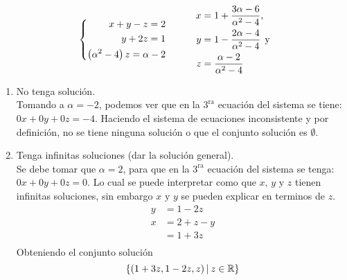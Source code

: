\documentclass{article}
\begin{document}
\begin{enumerate}
        \[
            \left\{
                \begin{aligned}
                    x + y - z = 2 \\
                    y + 2z = 1 \\
                    \left(\alpha^2 - 4\right)z = \alpha - 2
                \end{aligned}
            \right.
            \hspace{1cm}
            \begin{aligned}
                x &= 1 + \frac{3\alpha - 6}{\alpha^2 - 4} \text{,} \\
                y &= 1 - \frac{2\alpha - 4}{\alpha^2 - 4} \hspace{1ex} \text{y}  \\
                z &= \frac{\alpha - 2}{\alpha^2 - 4}
            \end{aligned}
        \]
        \begin{enumerate}[label=\listAlph]
            \item No tenga solución. \\
                Tomando a \(\alpha = -2\), podemos ver que en la \(3^{\text{ra}}\) ecuación del sistema se tiene: \(0x + 0y + 0z = -4\). 
                Haciendo el sistema de ecuaciones inconsistente y por definición, no se tiene ninguna solución o que el conjunto solución es \(\emptyset\).
            \item Tenga infinitas soluciones (dar la solución general). \\
                Se debe tomar que \(\alpha = 2\), para que en la \(3^{\text{ra}}\) ecuación del sistema se tenga: \(0x + 0y + 0z = 0\).
                Lo cual se puede interpretar como  que \(x \text{, } y \text{ y } z\) tienen infinitas soluciones, 
                sin embargo \(x \text{ y } y\) se pueden explicar en terminos de \(z\).
                \[
                    \begin{aligned}
                        y &= 1 - 2z \\
                        x &= 2 + z - y \\
                        &= 1 + 3z \\
                    \end{aligned}
                \]
                Obteniendo el conjunto solución
                \[
                    \left\{\left(1 + 3z, 1 - 2z, z\right) \vert\hspace{0.5ex} z \in \mathbb{R} \right\}
                \]


\end{enumerate}
\end{enumerate}
\end{document}
